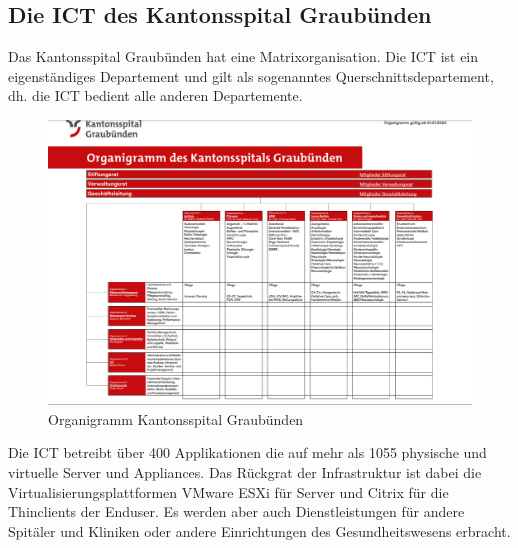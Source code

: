 \subsection{Die ICT des Kantonsspital Graubünden}
Das Kantonsspital Graubünden hat eine Matrixorganisation.
Die ICT ist ein eigenständiges Departement und gilt als sogenanntes Querschnittsdepartement, dh.
die ICT bedient alle anderen Departemente.
\begin{figure}[H]
    \centering
    \includegraphics[width=1\linewidth]{source/introduction/initial_situation/Organigramm_KSGR}
    \caption{Organigramm Kantonsspital Graubünden}
    \label{fig:Organigramm_KSGR}
\end{figure}

Die ICT betreibt über 400 Applikationen die auf mehr als 1055 physische und virtuelle Server und Appliances.
Das Rückgrat der Infrastruktur ist dabei die Virtualisierungsplattformen VMware ESXi für Server und Citrix für die Thinclients der Enduser.
Es werden aber auch Dienstleistungen für andere Spitäler und Kliniken oder andere Einrichtungen des Gesundheitswesens erbracht.

